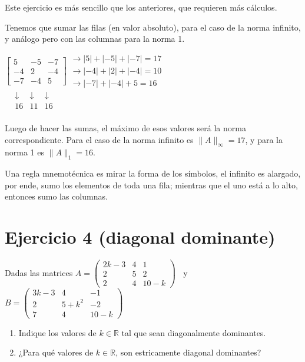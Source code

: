\documentclass[11pt]{article}
\begin{document}
	Este ejercicio es más sencillo que los anteriores, que requieren más cálculos.
	
	Tenemos que sumar las filas (en valor absoluto), para el caso de la norma infinito, y análogo pero con las columnas para la norma 1.
	
	$\begin{bmatrix}
		5 & -5 & -7\\
		-4 & 2 & -4 \\
		-7 & -4 & 5
	\end{bmatrix}$$\begin{matrix}
	\rightarrow |5| + |-5| + |-7| = 17 \\
	\rightarrow |-4| + |2| + |-4| = 10 \\
	\rightarrow |-7| + |-4| + 5 = 16
\end{matrix}$\\$
\begin{matrix}
	\;\;\;\downarrow & \downarrow & \downarrow\\
	\;\;\;16 & 11 & 16\\
\end{matrix}$
		
		Luego de hacer las sumas, el máximo de esos valores será la norma correspondiente. Para el caso de la norma infinito es $\lVert A \rVert_\infty=17$, y para la norma 1 es $\lVert A \rVert_1=16$.
		
		Una regla mnemotécnica es mirar la forma de los símbolos, el infinito es alargado, por ende, sumo los elementos de toda una fila; mientras que el uno está a lo alto, entonces sumo las columnas.
		
	\section{Ejercicio 4 (diagonal dominante)}
	Dadas las matrices $A=\begin{pmatrix}
	2k-3 & 4 & 1 \\
	2 & 5 & 2 \\
	2 & 4 & 10-k	
	\end{pmatrix} \;\;$ y $B=\begin{pmatrix}
	3k-3 & 4 & -1 \\
	2 & 5+k^2 & -2 \\
	7 & 4 & 10-k
	\end{pmatrix}$
	
	\begin{enumerate}[label=\alph*)]
		\item Indique los valores de $k \in \mathbb{R}$ tal que sean diagonalmente dominantes.
		\item ¿Para qué valores de $k \in \mathbb{R}$, son estricamente diagonal dominantes?
	\end{enumerate}
\end{document}
